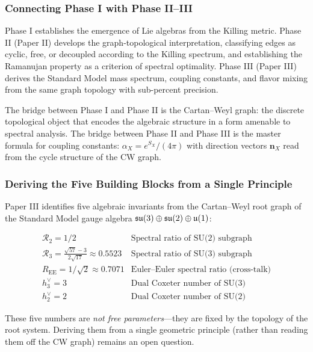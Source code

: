 \subsubsection{Connecting Phase I with Phase II--III}\label{sec:connecting_phases}

Phase I establishes the emergence of Lie algebras from the Killing metric. Phase II (Paper II) develops the graph-topological interpretation, classifying edges as cyclic, free, or decoupled according to the Killing spectrum, and establishing the Ramanujan property as a criterion of spectral optimality. Phase III (Paper III) derives the Standard Model mass spectrum, coupling constants, and flavor mixing from the same graph topology with sub-percent precision.

The bridge between Phase I and Phase II is the Cartan--Weyl graph: the discrete topological object that encodes the algebraic structure in a form amenable to spectral analysis. The bridge between Phase II and Phase III is the master formula for coupling constants: $\alpha_X = e^{S_X}/(4\pi)$ with direction vectors $\mathbf{n}_X$ read from the cycle structure of the CW graph.

\subsubsection{Deriving the Five Building Blocks from a Single Principle}\label{sec:building_blocks}

Paper III identifies five algebraic invariants from the Cartan--Weyl root graph of the Standard Model gauge algebra $\mathfrak{su}(3) \oplus \mathfrak{su}(2) \oplus \mathfrak{u}(1)$:

\begin{equation}
\begin{array}{ll}
\mathcal{R}_2 = 1/2 & \text{Spectral ratio of SU(2) subgraph} \\
\mathcal{R}_3 = \frac{\sqrt{57}-3}{2\sqrt{17}} \approx 0.5523 & \text{Spectral ratio of SU(3) subgraph} \\
R_{\mathrm{EE}} = 1/\sqrt{2} \approx 0.7071 & \text{Euler--Euler spectral ratio (cross-talk)} \\
h^\vee_3 = 3 & \text{Dual Coxeter number of SU(3)} \\
h^\vee_2 = 2 & \text{Dual Coxeter number of SU(2)}
\end{array}
\end{equation}

These five numbers are \textit{not free parameters}---they are fixed by the topology of the root system. Deriving them from a single geometric principle (rather than reading them off the CW graph) remains an open question.


